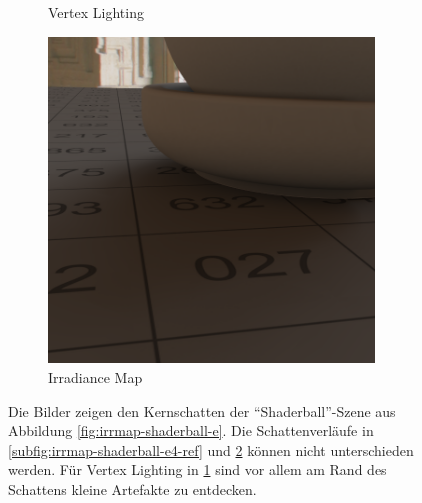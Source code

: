 \begin{figure}[h]
\begin{subfigure}[t]{0.33\textwidth}
				\caption{Vertex Lighting}
				\label{subfig:irrmap-shaderball-e4-vmap}
			\end{subfigure}
			\begin{subfigure}[t]{0.33\textwidth}
				\center
				\includegraphics[width=0.95\textwidth]{pic/irrmap-shaderball_e4-irrmap.png}
				\caption{Irradiance Map}
				\label{subfig:irrmap-shaderball-e4-irrmap}
			\end{subfigure}
			\caption[Irradiance Map der \enquote{Shaderball}-Szene mit der \enquote{Ennis-Brown House}-HDR]{Die Bilder zeigen den Kernschatten der \enquote{Shaderball}-Szene aus Abbildung \ref{fig:irrmap-shaderball-e}. Die Schattenverläufe in \ref{subfig:irrmap-shaderball-e4-ref} und \ref{subfig:irrmap-shaderball-e4-irrmap} können nicht unterschieden werden. Für Vertex Lighting in \ref{subfig:irrmap-shaderball-e4-vmap} sind vor allem am Rand des Schattens kleine Artefakte zu entdecken.}
			\label{fig:irrmap-shaderball-e4}
		\end{figure}

